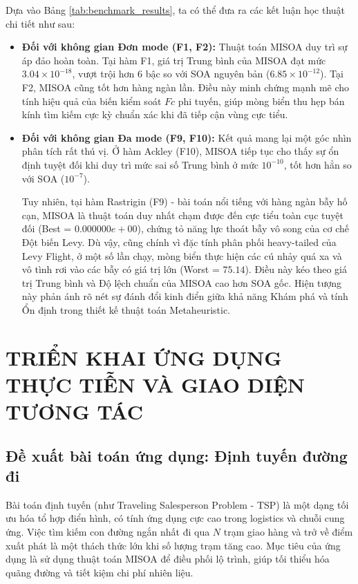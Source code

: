 \documentclass[12pt, a4paper]{article}
\begin{document}
Dựa vào Bảng \ref{tab:benchmark_results}, ta có thể đưa ra các kết luận học thuật chi tiết như sau:
\begin{itemize}
    \item \textbf{Đối với không gian Đơn mode (F1, F2):} Thuật toán MISOA duy trì sự áp đảo hoàn toàn. Tại hàm F1, giá trị Trung bình của MISOA đạt mức $3.04 \times 10^{-18}$, vượt trội hơn 6 bậc so với SOA nguyên bản ($6.85 \times 10^{-12}$). Tại F2, MISOA cũng tốt hơn hàng ngàn lần. Điều này minh chứng mạnh mẽ cho tính hiệu quả của biến kiểm soát $Fc$ phi tuyến, giúp mòng biển thu hẹp bán kính tìm kiếm cực kỳ chuẩn xác khi đã tiếp cận vùng cực tiểu.
    
    \item \textbf{Đối với không gian Đa mode (F9, F10):} Kết quả mang lại một góc nhìn phân tích rất thú vị. Ở hàm Ackley (F10), MISOA tiếp tục cho thấy sự ổn định tuyệt đối khi duy trì mức sai số Trung bình ở mức $10^{-10}$, tốt hơn hẳn so với SOA ($10^{-7}$). 
    
    Tuy nhiên, tại hàm Rastrigin (F9) - bài toán nổi tiếng với hàng ngàn bẫy hố cạn, MISOA là thuật toán duy nhất chạm được đến cực tiểu toàn cục tuyệt đối (Best = $0.000000e+00$), chứng tỏ năng lực thoát bẫy vô song của cơ chế Đột biến Levy. Dù vậy, cũng chính vì đặc tính phân phối heavy-tailed của Levy Flight, ở một số lần chạy, mòng biển thực hiện các cú nhảy quá xa và vô tình rơi vào các bẫy có giá trị lớn (Worst = $75.14$). Điều này kéo theo giá trị Trung bình và Độ lệch chuẩn của MISOA cao hơn SOA gốc. Hiện tượng này phản ánh rõ nét sự đánh đổi kinh điển giữa khả năng Khám phá và tính Ổn định trong thiết kế thuật toán Metaheuristic.
\end{itemize}

\newpage
\section{TRIỂN KHAI ỨNG DỤNG THỰC TIỄN VÀ GIAO DIỆN TƯƠNG TÁC}

\subsection{Đề xuất bài toán ứng dụng: Định tuyến đường đi}
Bài toán định tuyến (như Traveling Salesperson Problem - TSP) là một dạng tối ưu hóa tổ hợp điển hình, có tính ứng dụng cực cao trong logistics và chuỗi cung ứng. Việc tìm kiếm con đường ngắn nhất đi qua $N$ trạm giao hàng và trở về điểm xuất phát là một thách thức lớn khi số lượng trạm tăng cao. Mục tiêu của ứng dụng là sử dụng thuật toán MISOA để điều phối lộ trình, giúp tối thiểu hóa quãng đường và tiết kiệm chi phí nhiên liệu.
\end{document}
